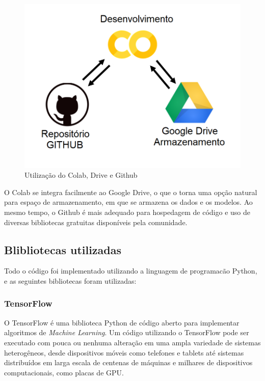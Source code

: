 \begin{figure}[htbp]
		\centering
		\includegraphics[scale=0.4]{figuras/MachineLearning/colabGithub.png}
		\caption{Utilização do Colab, Drive e Github}
		\label{fig:colabGithub}
\end{figure}

O Colab se integra facilmente ao Google Drive, o que o torna uma opção natural para espaço de armazenamento, em que se armazena os dados e os modelos. Ao mesmo tempo, o Github é mais adequado para hospedagem de código e uso de diversas  bibliotecas gratuitas disponíveis pela comunidade. 

\subsection{Blibliotecas utilizadas}

Todo o código foi implementado utilizando a linguagem de programacão Python, e as seguintes bibliotecas foram utilizadas:


\subsubsection{TensorFlow}

O TensorFlow é uma biblioteca Python de código aberto para implementar algoritmos de \textit{Machine Learning}. Um código utilizando o TensorFlow pode ser executado com pouca ou nenhuma alteração em uma ampla variedade de sistemas heterogêneos, desde dispositivos móveis como telefones e tablets até sistemas distribuídos em larga escala de centenas de máquinas e milhares de dispositivos computacionais, como placas de GPU.

